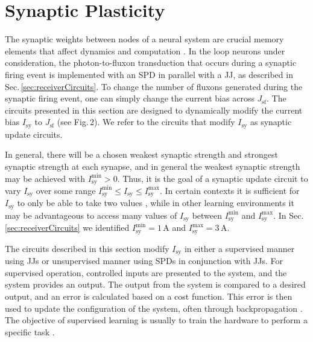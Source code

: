 \documentclass[twocolumn]{article}
\begin{document}
\section{\label{sec:synapticPlasticity}Synaptic Plasticity}
The synaptic weights between nodes of a neural system are crucial memory elements that affect dynamics and computation \cite{abre2004,bu2006,siqu2007,haah2015}. In the loop neurons under consideration, the photon-to-fluxon transduction that occurs during a synaptic firing event is implemented with an SPD in parallel with a JJ, as described in Sec.\,\ref{sec:receiverCircuits}. To change the number of fluxons generated during the synaptic firing event, one can simply change the current bias across $J_{\mathrm{sf}}$. The circuits presented in this section are designed to dynamically modify the current bias $I_{\mathrm{sy}}$ to $J_{\mathrm{sf}}$ (see Fig.\,2). We refer to the circuits that modify $I_{\mathrm{sy}}$ as synaptic update circuits.

In general, there will be a chosen weakest synaptic strength and strongest synaptic strength at each synapse, and in general the weakest synaptic strength may be achieved with $I_{\mathrm{sy}}^{\mathrm{min}} > 0$. Thus, it is the goal of a synaptic update circuit to vary $I_{\mathrm{sy}}$ over some range $I_{\mathrm{sy}}^{\mathrm{min}}\le I_{\mathrm{sy}} \le I_{\mathrm{sy}}^{\mathrm{max}}$. In certain contexts it is sufficient for $I_{\mathrm{sy}}$ to only be able to take two values  \cite{lide2015}, while in other learning environments it may be advantageous to access many values of $I_{\mathrm{sy}}$ between $I_{\mathrm{sy}}^{\mathrm{min}}$ and $I_{\mathrm{sy}}^{\mathrm{max}}$. In Sec.\,\ref{sec:receiverCircuits} we identified $I_{\mathrm{sy}}^{\mathrm{min}} = 1$\,\textmu A and $I_{\mathrm{sy}}^{\mathrm{max}} = 3$\,\textmu A. 

The circuits described in this section modify $I_{\mathrm{sy}}$ in either a supervised manner using JJs or unsupervised manner using SPDs in conjunction with JJs. For supervised operation, controlled inputs are presented to the system, and the system provides an output. The output from the system is compared to a desired output, and an error is calculated based on a cost function. This error is then used to update the configuration of the system, often through backpropagation \cite{ni2015}. The objective of supervised learning is usually to train the hardware to perform a specific task \cite{sihu2016}. 
\end{document}
